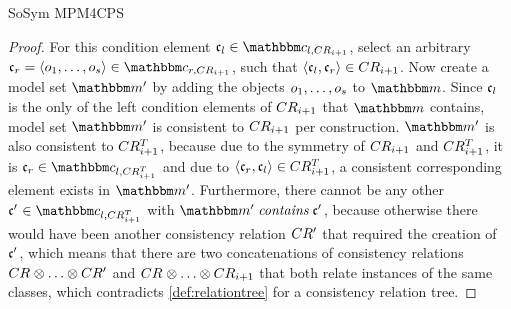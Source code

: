 \begin{copiedFrom}{SoSym MPM4CPS}
\begin{proof}
    For this condition element $\conditionelement{c}{l} \in \condition{c}{l,\consistencyrelation{CR}{i+1}}$, select an arbitrary $\conditionelement{c}{r} = \tupled{\object{o}{1}, \dots, \object{o}{s}} \in \condition{c}{r, \consistencyrelation{CR}{i+1}}$, such that $\langle \mathfrak{c}_{l}, \mathfrak{c}_{r} \rangle \in CR_{i+1}$.
    Now create a model set $\modelset{m'}$ by adding the objects $o_{1}, \dots, o_{s}$ to $\modelset{m}$.
    Since $\mathfrak{c}_{l}$ is the only of the left condition elements of $CR_{i+1}$ that $\modelset{m}$ contains, model set $\modelset{m'}$ is consistent to $CR_{i+1}$ per construction.
    $\modelset{m'}$ is also consistent to $CR^T_{i+1}$, because due to the symmetry of $CR_{i+1}$ and $CR^T_{i+1}$, it is $\conditionelement{c}{r} \in \condition{c}{l,\consistencyrelation{CR^T}{i+1}}$ and due to $\langle \mathfrak{c}_{r}, \mathfrak{c}_{l} \rangle \in CR^T_{i+1}$, a consistent corresponding element exists in $\modelset{m'}$. 
    Furthermore, there cannot be any other $\conditionelement{c'}{} \in \condition{c}{l,\consistencyrelation{CR^T}{i+1}}$ with $\modelset{m'} \containsmath \conditionelement{c'}{}$, because otherwise there would have been another consistency relation $CR'_{}$ that required the creation of $\mathfrak{c'}_{}$, which means that there are two concatenations of consistency relations $\consistencyrelation{CR}{} \concat \dots \concat \consistencyrelation{CR'}{}$ and $\consistencyrelation{CR}{} \concat \dots \concat \consistencyrelation{CR}{i+1}$ that both relate instances of the same classes, which contradicts \autoref{def:relationtree} for a consistency relation tree.
    

\end{proof}
\end{copiedFrom}
